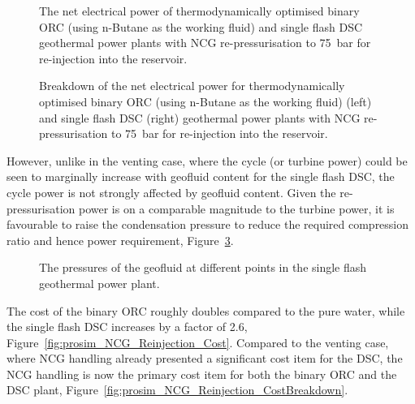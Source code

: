         \begin{figure}[H]
            \centering
            
            \caption[The net electrical power of thermodynamically optimised binary \ac{ORC} and single flash \ac{DSC} geothermal power plants re-injecting \ac{NCG} into the reservoir.]{The net electrical power of thermodynamically optimised binary \ac{ORC} (using n-Butane as the working fluid) and single flash \ac{DSC} geothermal power plants with \ac{NCG} re-pressurisation to \qty{75}{\bar} for re-injection into the reservoir.}
            \label{fig:prosim_NCG_Reinjection_Wnet}
        \end{figure}

        \begin{figure}[H]
            \centering
            
            \caption[Breakdown of the net electrical power for thermodynamically optimised binary \ac{ORC} and single flash \ac{DSC} geothermal power plants re-injecting \ac{NCG} into the reservoir.]{Breakdown of the net electrical power for thermodynamically optimised binary \ac{ORC} (using n-Butane as the working fluid) (left) and single flash \ac{DSC} (right) geothermal power plants with \ac{NCG} re-pressurisation to \qty{75}{\bar} for re-injection into the reservoir.}
            \label{fig:prosim_NCG_Reinjection_Power_Breakdown}
        \end{figure}

        However, unlike in the venting case, where the cycle (or turbine power) could be seen to marginally increase with geofluid  content for the single flash \ac{DSC}, the cycle power is not strongly affected by geofluid  content. Given the re-pressurisation power is on a comparable magnitude to the turbine power, it is favourable to raise the condensation pressure to reduce the required compression ratio and hence power requirement, Figure~\ref{fig:prosim_NCG_Reinjection_OPs}.  
        \begin{figure}[H]
            \centering
            
            \caption{The pressures of the geofluid at different points in the single flash geothermal power plant.}
            \label{fig:prosim_NCG_Reinjection_OPs}
        \end{figure}

        The cost of the binary \ac{ORC} roughly doubles compared to the pure water, while the single flash \ac{DSC} increases by a factor of \num{2.6}, Figure~\ref{fig:prosim_NCG_Reinjection_Cost}. Compared to the venting case, where \ac{NCG} handling already presented a significant cost item for the \ac{DSC}, the \ac{NCG} handling is now the primary cost item for both the binary \ac{ORC} and the \ac{DSC} plant, Figure~\ref{fig:prosim_NCG_Reinjection_CostBreakdown}.
        
